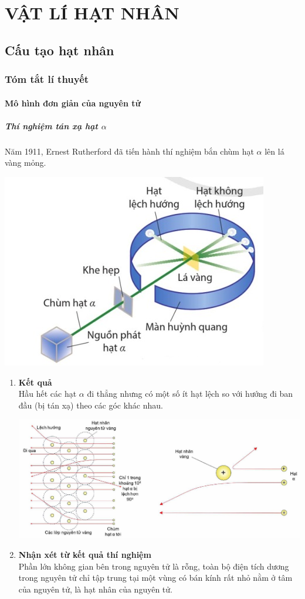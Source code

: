 \chapter{VẬT LÍ HẠT NHÂN}
\setcounter{section}{18}
\section{Cấu tạo hạt nhân}
\subsection{Tóm tắt lí thuyết}
\begin{tomtat}
	\subsubsection{Mô hình đơn giản của nguyên tử}
	\paragraph{Thí nghiệm tán xạ hạt $\alpha$}
	Năm 1911, Ernest Rutherford đã tiến hành thí nghiệm bắn chùm hạt $\alpha$ lên lá vàng mỏng.
	\begin{center}
		\includegraphics[width=0.4\linewidth]{figs/VN12-Y24-PH-SYL-025-1}
	\end{center}
	\begin{enumerate}[label=\bfseries \alph*)]
		\item \textbf{Kết quả}\\
		Hầu hết các hạt $\alpha$ đi thẳng nhưng có một số ít hạt lệch so với hướng đi ban đầu (bị tán xạ) theo các góc khác nhau.
		\begin{center}
			\includegraphics[width=0.9\linewidth]{figs/VN12-Y24-PH-SYL-025-2}
		\end{center}
		\item \textbf{Nhận xét từ kết quả thí nghiệm}\\
		Phần lớn không gian bên trong nguyên tử là rỗng, toàn bộ điện tích dương trong nguyên tử chỉ tập trung tại một vùng có bán kính rất nhỏ nằm ở tâm của nguyên tử, là hạt nhân của nguyên tử.
	\end{enumerate}

\end{tomtat}
